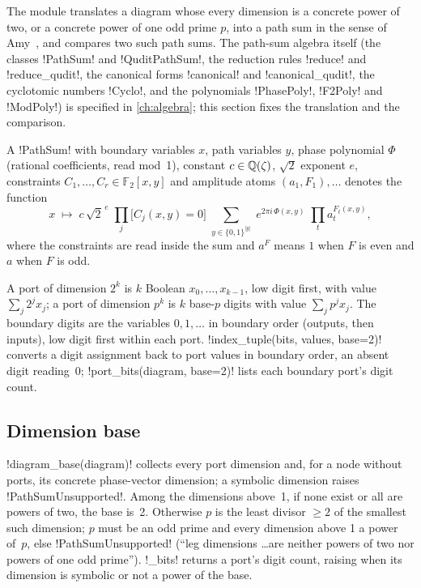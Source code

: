 The module  translates a diagram whose every dimension is a concrete power of two, or a concrete power of one odd prime $p$, into a path sum in the sense of Amy~\cite{amy2018pathsums}, and compares two such path sums. The path-sum algebra itself (the classes \py!PathSum! and \py!QuditPathSum!, the reduction rules \py!reduce! and \py!reduce_qudit!, the canonical forms \py!canonical! and \py!canonical_qudit!, the cyclotomic numbers \py!Cyclo!, and the polynomials \py!PhasePoly!, \py!F2Poly! and \py!ModPoly!) is specified in \cref{ch:algebra}; this section fixes the translation and the comparison.

\begin{definition}\label{def:semantics-binary-pathsum}
A \py!PathSum! with boundary variables $x$, path variables $y$, phase polynomial $\Phi$ (rational coefficients, read mod~1), constant $c\in\mathbb{Q}(\zeta)$, $\sqrt2$ exponent $e$, constraints $C_1,\dots,C_r\in\mathbb F_2[x,y]$ and amplitude atoms $(a_1,F_1),\dots$ denotes the function
\[
x\;\mapsto\; c\,\sqrt2^{\,e}\;\prod_{j}\bigl[C_j(x,y)=0\bigr]\;\sum_{y\in\{0,1\}^{|y|}}\;e^{2\pi i\,\Phi(x,y)}\;\prod_{t}a_t^{F_t(x,y)},
\]
where the constraints are read inside the sum and $a^{F}$ means $1$ when $F$ is even and $a$ when $F$ is odd.
\end{definition}

\begin{definition}[Digits]\label{def:semantics-digits}
A port of dimension $2^k$ is $k$ Boolean  $x_0,\dots,x_{k-1}$, low digit first, with value $\sum_j 2^j x_j$; a port of dimension $p^k$ is $k$ base-$p$ digits with value $\sum_j p^j x_j$. The boundary digits are the variables $0,1,\dots$ in boundary order (outputs, then inputs), low digit first within each port. \py!index_tuple(bits, values, base=2)! converts a digit assignment back to port values in boundary order, an absent digit reading~0; \py!port_bits(diagram, base=2)! lists each boundary port's digit count.
\end{definition}

\subsection{Dimension base}

\py!diagram_base(diagram)! collects every port dimension and, for a node without ports, its concrete phase-vector dimension; a symbolic dimension raises \py!PathSumUnsupported!. Among the dimensions above~1, if none exist or all are powers of two, the base is~2. Otherwise $p$ is the least divisor $\ge 2$ of the smallest such dimension; $p$ must be an odd prime and every dimension above 1 a power of~$p$, else \py!PathSumUnsupported! (``leg dimensions \ldots are neither powers of two nor powers of one odd prime''). \py!_bits! returns a port's digit count, raising when its dimension is symbolic or not a power of the base.

